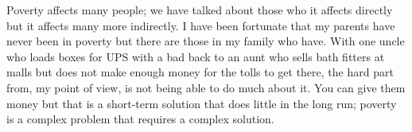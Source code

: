 \documentclass{article}
\begin{document}
Poverty affects many people; we have talked about those who it affects directly but it affects many more indirectly. I have been fortunate that my parents have never been in poverty but there are those in my family who have. With one uncle who loads boxes for UPS with a bad back to an aunt who sells bath fitters at malls but does not make enough money for the tolls to get there, the hard part from, my point of view, is not being able to do much about it. You can give them money but that is a short-term solution that does little in the long run; poverty is a complex problem that requires a complex solution.
\end{document}
